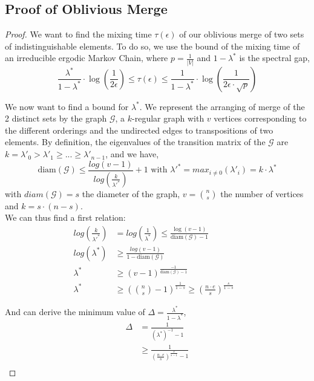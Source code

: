 \documentclass[USenglish,oneside,twocolumn]{article}
\begin{document}
\subsection{Proof of Oblivious Merge}\label{proof:OM}
\begin{proof}
We want to find the mixing time $\tau(\epsilon)$ of our oblivious merge of two sets of indistinguishable elements. To do so, we use the bound of the mixing time of an irreducible ergodic Markov Chain, where $p = \frac{1}{|V|}$ and $1-\lambda^*$ is the spectral gap,
$$\frac{\lambda^*}{1-\lambda^*} \cdot \log\left(\frac{1}{2 \epsilon} \right)\leq \tau(\epsilon) \leq \frac{1}{1-\lambda^*}\cdot \log \left( \frac{1}{2 \epsilon \cdot \sqrt{p}}\right) $$

We now want to find a bound for $\lambda^*$. We represent the arranging of merge of the 2 distinct sets by the graph $\mathcal{G}$, a $k$-regular graph with $v$ vertices corresponding to the different orderings and the undirected edges to transpositions of two elements.
By definition, the eigenvalues of the transition matrix of the $\mathcal{G}$ are $k={\lambda'}_0 > {\lambda'}_1 \geq  ... \geq {\lambda'}_{n-1}$, and we have,
$$\text{diam}\left( \mathcal{G}\right) \leq \frac{log(v-1)}{log(\frac{k}{{\lambda'}^*})}+1 \text{ with } {\lambda'}^* = max_{i\neq0}({\lambda'}_i)= k \cdot \lambda^*$$
with $diam\left( \mathcal{G} \right)=s$ the diameter of the graph, $v= {n \choose s}$ the number of vertices and $k=s\cdot(n-s)$.\\


We can thus find a first relation:
\begin{align*}
log(\frac{k}{{\lambda'}^*}) &= log(\frac{1}{{\lambda}^*}) \leq\frac{\log(v-1)}{\text{diam}\left(\mathcal{G}\right)-1}&\\
log({{\lambda}^*}) &\geq  \frac{log(v-1)}{1-\text{diam}\left(\mathcal{G}\right)}&\\
{\lambda}^* &\geq (v-1)^{\frac{-1}{\text{diam}\left(\mathcal{G}\right)-1}}\\
{\lambda}^* &\geq \left ({n \choose s}-1 \right )^{\frac{1}{1-s}} \geq \left (\frac{n\cdot e}{s} \right )^{\frac{s}{1-s}}
\end{align*}

And can derive the minimum value of $\Delta=\frac{\lambda^*}{1-\lambda^*}$,
\begin{align*}
 \Delta &= \frac{1}{\left (\lambda^*\right )^{-1}-1}\\
 &\geq \frac{1}{\left (\frac{n \cdot e }{s} \right )^{\frac{s}{s-1}}-1}\\
\end{align*}



\end{proof}
\end{document}
